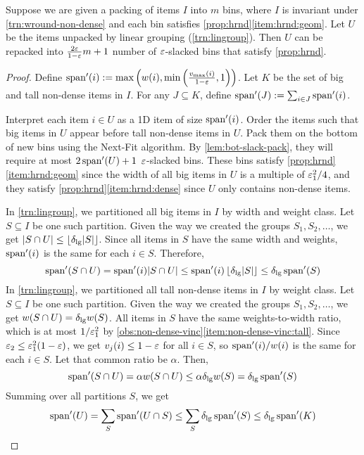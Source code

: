 \begin{lemma}
\label{thm:lg-repack}
Suppose we are given a packing of items $I$ into $m$ bins,
where $I$ is invariant under \cref{trn:wround-non-dense} and
each bin satisfies \cref{prop:hrnd}\ref{item:hrnd:geom}.
Let $U$ be the items unpacked by linear grouping (\cref{trn:lingroup}).
Then $U$ can be repacked into $\frac{2\varepsilon}{1-\varepsilon}m + 1$ number of
$\varepsilon$-slacked bins that satisfy \cref{prop:hrnd}.
\end{lemma}
\begin{proof}
Define $\operatorname{span}'(i) := \max\left(w(i), \min\left(\frac{v_{\max}(i)}{1-\varepsilon}, 1\right)\right)$.
Let $K$ be the set of big and tall non-dense items in $I$.
For any $J \subseteq K$, define $\operatorname{span}'(J) := \sum_{i \in J} \operatorname{span}'(i)$.

Interpret each item $i \in U$ as a 1D item of size $\operatorname{span}'(i)$.
Order the items such that big items in $U$ appear before tall non-dense items in $U$.
Pack them on the bottom of new bins using the Next-Fit algorithm.
By \cref{lem:bot-slack-pack}, they will require at most $2\operatorname{span}'(U) + 1$ $\varepsilon$-slacked bins.
These bins satisfy \cref{prop:hrnd}\ref{item:hrnd:geom}
since the width of all big items in $U$ is a multiple of $\varepsilon_1^2/4$,
and they satisfy \cref{prop:hrnd}\ref{item:hrnd:dense} since $U$
only contains non-dense items.

In \cref{trn:lingroup}, we partitioned all big items in $I$ by width and weight class.
Let $S \subseteq I$ be one such partition.
Given the way we created the groups $S_1, S_2, \ldots$, we get
$|S \cap U| \le \left\lfloor \delta_{\mathrm{lg}}|S| \right\rfloor$.
Since all items in $S$ have the same width and weights,
$\operatorname{span}'(i)$ is the same for each $i \in S$. Therefore,
\[ \operatorname{span}'(S \cap U) = \operatorname{span}'(i)|S \cap U|
\le \operatorname{span}'(i)\left\lfloor \delta_{\mathrm{lg}} |S| \right\rfloor
\le \delta_{\mathrm{lg}} \operatorname{span}'(S) \]
%
In \cref{trn:lingroup}, we partitioned all tall non-dense items in $I$ by weight class.
Let $S \subseteq I$ be one such partition.
Given the way we created the groups $S_1, S_2, \ldots$, we get $w(S \cap U) = \delta_{\mathrm{lg}} w(S)$.
All items in $S$ have the same weights-to-width ratio,
which is at most $1/\varepsilon_1^2$ by \cref{obs:non-dense-vinc}\ref{item:non-dense-vinc:tall}.
Since $\varepsilon_2 \le \varepsilon_1^2(1-\varepsilon)$,
we get $v_j(i) \le 1-\varepsilon$ for all $i \in S$,
so $\operatorname{span}'(i)/w(i)$ is the same for each $i \in S$.
Let that common ratio be $\alpha$. Then,
\[ \operatorname{span}'(S \cap U) = \alpha w(S \cap U)
\le \alpha \delta_{\mathrm{lg}} w(S) = \delta_{\mathrm{lg}} \operatorname{span}'(S) \]
Summing over all partitions $S$, we get
\begin{equation}
\label{eqn:unpacked-vs-packed}
\operatorname{span}'(U) = \sum_S \operatorname{span}'(U \cap S) \le \sum_S \delta_{\mathrm{lg}} \operatorname{span}'(S)
    \le \delta_{\mathrm{lg}} \operatorname{span}'(K)
\end{equation}


\end{proof}
